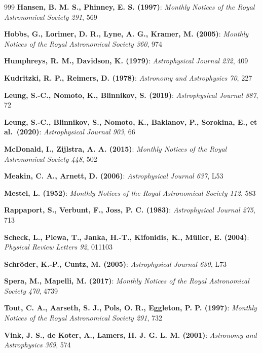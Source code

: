 \begin{thebibliography}{999}
\textbf{Hansen, B. M. S., Phinney, E. S. (1997)}:     \textit{Monthly Notices of the Royal Astronomical Society 291}, 569

\textbf{Hobbs, G., Lorimer, D. R., Lyne, A. G., Kramer, M. (2005)}:     \textit{Monthly Notices of the Royal Astronomical Society 360}, 974

\textbf{Humphreys, R. M., Davidson, K. (1979)}:     \textit{Astrophysical Journal 232}, 409

\textbf{Kudritzki, R. P., Reimers, D. (1978)}:     \textit{Astronomy and Astrophysics 70}, 227

\textbf{Leung, S.-C., Nomoto, K., Blinnikov, S. (2019)}:     \textit{Astrophysical Journal 887}, 72

\textbf{Leung, S.-C., Blinnikov, S., Nomoto, K., Baklanov, P., Sorokina, E., et al.\ (2020)}:     \textit{Astrophysical Journal 903}, 66

\textbf{McDonald, I., Zijlstra, A. A. (2015)}:     \textit{Monthly Notices of the Royal Astronomical Society 448}, 502

\textbf{Meakin, C. A., Arnett, D. (2006)}:     \textit{Astrophysical Journal 637}, L53

\textbf{Mestel, L. (1952)}:     \textit{Monthly Notices of the Royal Astronomical Society 112}, 583

\textbf{Rappaport, S., Verbunt, F., Joss, P. C. (1983)}:     \textit{Astrophysical Journal 275}, 713

\textbf{Scheck, L., Plewa, T., Janka, H.-T., Kifonidis, K., M\"uller, E. (2004)}:     \textit{Physical Review Letters 92}, 011103

\textbf{Schr\"oder, K.-P., Cuntz, M. (2005)}:     \textit{Astrophysical Journal 630}, L73

\textbf{Spera, M., Mapelli, M. (2017)}:     \textit{Monthly Notices of the Royal Astronomical Society 470}, 4739

\textbf{Tout, C. A., Aarseth, S. J., Pols, O. R., Eggleton, P. P. (1997)}:     \textit{Monthly Notices of the Royal Astronomical Society 291}, 732

\textbf{Vink, J. S., de Koter, A., Lamers, H. J. G. L. M. (2001)}:     \textit{Astronomy and Astrophysics 369}, 574


\end{thebibliography}
